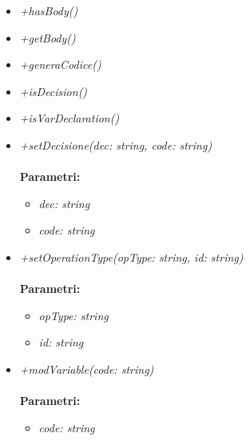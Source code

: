 \begin{itemize}
\begin{itemize}
\begin{itemize}
    		\end{itemize}
    		\item \emph{+hasBody()}\\
    		
    		\item \emph{+getBody()}\\
    		
    		\item \emph{+generaCodice()}\\
    		
    		\item \emph{+isDecision()}\\
    		
    		\item \emph{+isVarDeclaration()}\\
    		
    		\item \emph{+setDecisione(dec: string, code: string)}\\
    		\\
    		\textbf{Parametri:}
    		\begin{itemize}
    			\item \emph{dec: string}\\
    			
    			\item \emph{code: string}\\
    			
    		\end{itemize}
    		\item \emph{+setOperationType(opType: string, id: string)}\\
    		\\
    		\textbf{Parametri:}
    		\begin{itemize}
    			\item \emph{opType: string}\\
    			
    			\item \emph{id: string}\\
    			
    		\end{itemize}
    		\item \emph{+modVariable(code: string)}\\
    		\\
    		\textbf{Parametri:}
    		\begin{itemize}
    			\item \emph{code: string}\\
    			

\end{itemize}
\end{itemize}
\end{itemize}
